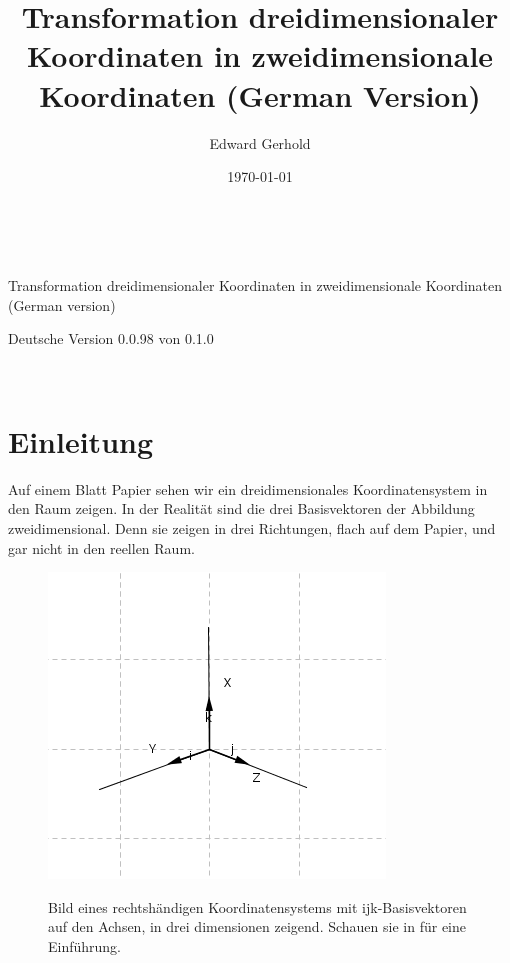 \documentclass[a4paper]{article}
\begin{document}
\begin{center}
\title{Transformation dreidimensionaler Koordinaten in zweidimensionale Koordinaten (German Version)}\\
\author{Edward Gerhold}
Transformation dreidimensionaler Koordinaten in zweidimensionale Koordinaten (German version)\\
\date{\today}
\maketitle


Deutsche Version 0.0.98 von 0.1.0\\

\end{center} 

\tableofcontents\\

\section{Einleitung}

Auf einem Blatt Papier sehen wir ein dreidimensionales Koordinatensystem in den Raum zeigen.
In der Realit\"at sind die drei Basisvektoren der Abbildung zweidimensional. Denn sie zeigen 
in drei Richtungen, flach auf dem Papier, und gar nicht in den reellen Raum.\\

\begin{figure}[ht]
\label{ijksystem}
\includegraphics[scale=2]{ijksystem.png}\\
\caption{Bild eines rechtsh\"andigen Koordinatensystems mit ijk-Basisvektoren auf den Achsen, in drei dimensionen zeigend. Schauen sie in \cite{Corral1} f\"ur eine Einf\"uhrung.}
\end{figure}
\end{document}

